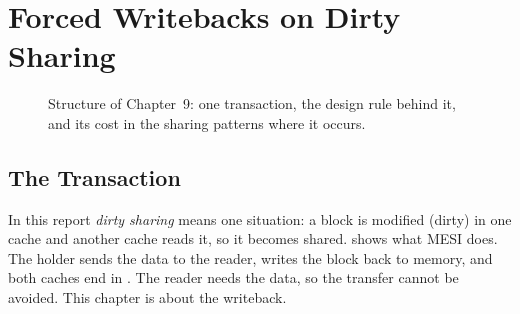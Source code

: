 \chapter{Forced Writebacks on Dirty Sharing}
\label{ch:dirty-sharing}

\begin{figure}[htbp]
\centering
{}
\caption[]{Structure of Chapter~9: one transaction, the
design rule behind it, and its cost in the sharing patterns where it occurs.}
\label{fig:ch9-map}
\end{figure}

\section{The Transaction}
\label{sec:dirty-transaction}
%

In this report \emph{dirty sharing} means one situation: a
block is modified (dirty) in one cache and another cache reads it, so it becomes
shared.  shows what MESI does. The holder sends the
data to the reader, writes the block back to memory, and both caches end in \stS.
The reader needs the data, so the transfer cannot be avoided. This chapter is
about the writeback.


